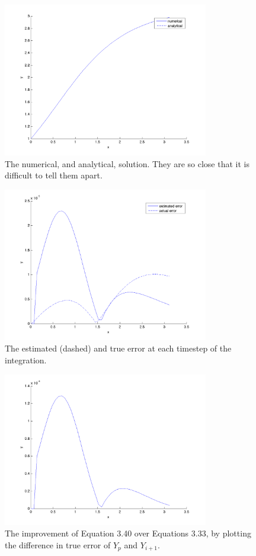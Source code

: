 \documentclass[11pt]{article}
\begin{document}
\begin{enumerate}
\begin{figure}[h!]
  \centering
    \includegraphics[width=0.8\textwidth]{andy_hw03_prb4_RK3_both.png}
  \caption{The numerical, and analytical, solution. They are so close that it is difficult to tell them apart.}
\end{figure}

\begin{figure}[h!]
  \centering
    \includegraphics[width=0.8\textwidth]{andy_hw03_prb4_RK3_error_both.png}
  \caption{The estimated (dashed) and true error at each timestep of the integration.}
\end{figure}

\begin{figure}[h!]
  \centering
    \includegraphics[width=0.8\textwidth]{andy_hw03_prb4_RK3_improvement.png}
  \caption{The improvement of Equation 3.40 over Equations 3.33, by plotting the difference in true error of $Y_p$ and $Y_{i+1}$.}
\end{figure}


\end{enumerate}
\end{document}
